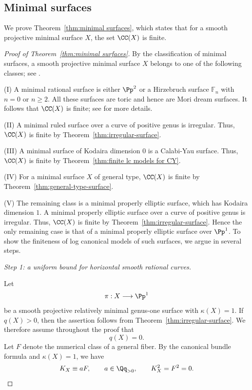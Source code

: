 \documentclass[12pt]{amsart}
\begin{document}
\subsection{Minimal surfaces}\label{subsec:minimal surfaces}

We prove Theorem~\ref{thm:minimal surfaces}, which states that for a
smooth projective minimal surface $X$, the set $\CC(X)$ is finite.

\begin{proof}[Proof of Theorem~\ref{thm:minimal surfaces}]
By the classification of minimal surfaces, a smooth projective minimal surface $X$ belongs to one of the following classes; see \cite[Chapter VI]{BHPV04}.

(I) A minimal rational surface is either $\Pp^2$ or a Hirzebruch surface
$\mathbb F_n$ with $n=0$ or $n\geq2$. All these surfaces are toric and
hence are Mori dream surfaces. It follows that $\CC(X)$ is finite; see \cite{HK00} for more details.

(II) A minimal ruled surface over a curve of positive genus is irregular. Thus, $\CC(X)$ is finite by Theorem~\ref{thm:irregular-surface}.

(III) A minimal surface of Kodaira dimension $0$ is a Calabi-Yau surface. Thus, $\CC(X)$ is finite by Theorem~\ref{thm:finite lc models for CY}.

(IV) For a minimal surface $X$ of general type, $\CC(X)$ is finite by Theorem~\ref{thm:general-type-surface}.

(V) The remaining class is a minimal properly elliptic surface,
which has Kodaira dimension $1$. A minimal properly elliptic surface over a curve of positive genus is irregular. Thus, $\CC(X)$ is finite by Theorem~\ref{thm:irregular-surface}. Hence the only remaining case is that of a minimal properly elliptic surface over $\Pp^1$. To show the finiteness of log canonical models of such surfaces, we argue in several steps.

\medskip
\noindent
\textit{Step 1: a uniform bound for horizontal smooth rational curves.}

Let
\[
    \pi:X\longrightarrow \Pp^1
\]
be a smooth projective relatively minimal genus-one surface with
$\kappa(X)=1$. If $q(X)>0$, then the assertion follows from Theorem~\ref{thm:irregular-surface}.
We therefore assume throughout the proof that
\[
    q(X)=0.
\]
Let $F$ denote the numerical class of a general fiber.  By the canonical bundle formula and $\kappa(X)=1$, we have
\begin{equation}\label{eq:elliptic-K-aF}
    K_X\equiv aF,
    \qquad a\in\Qq_{>0},
    \qquad K_X^2=F^2=0.
\end{equation}


\end{proof}
\end{document}
